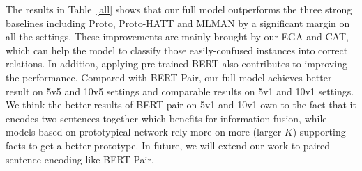 \documentclass[11pt]{article}
\begin{document}
The results in Table~\ref{all} shows that our full model outperforms the three strong baselines including Proto, Proto-HATT and MLMAN by a significant margin on all the settings.
These improvements are mainly brought by our EGA and CAT, which can help the model to classify those easily-confused instances into correct relations.
In addition, applying pre-trained BERT also contributes to improving the performance.
Compared with BERT-Pair, our full model achieves better result on 5v5 and 10v5 settings and comparable results on 5v1 and 10v1 settings.
We think the better results of BERT-pair on 5v1 and 10v1 own to the fact that it encodes two sentences together which benefits for information fusion, while models based on prototypical network rely more on more (larger $K$) supporting facts to get a better prototype.
In future, we will extend our work to paired sentence encoding like BERT-Pair.
\end{document}
